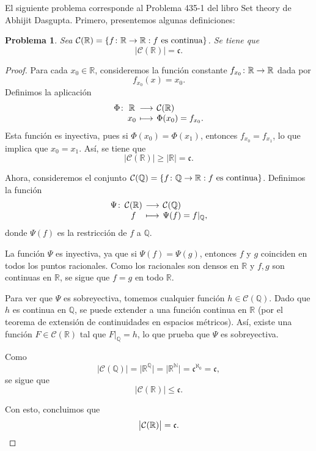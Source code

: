 \documentclass[a4,10pt]{aleph-notas}
\newtheorem*{prob}{Problema}
\begin{document}
\encabezado

\noindent
El siguiente problema corresponde al Problema 435-1 del libro Set theory de Abhijit Dasgupta. Primero, presentemos algunas definiciones:


\begin{prob}
    Sea $\mathcal{C}(\mathbb{R}) = \{ f\colon \mathbb{R} \rightarrow \mathbb{R} : f\text{ es continua} \}$. Se tiene que
    \[
        \big|\mathcal{C}(\mathbb{R})\big| = \mathfrak{c}.
    \]
\end{prob}

\begin{proof}
    Para cada $x_0 \in \mathbb{R}$, consideremos la función constante $f_{x_0}\colon \mathbb{R} \rightarrow \mathbb{R}$ dada por
    \[
        f_{x_0}(x) = x_0.
    \]
    Definimos la aplicación
    \[
        \funcion{\Phi}{\mathbb{R}}{\mathcal{C}(\mathbb{R})}{x_0}{\Phi(x_0) = f_{x_0}.}
    \]
    Esta función es inyectiva, pues si $\Phi(x_0) = \Phi(x_1)$, entonces $f_{x_0} = f_{x_1}$, lo que implica que $x_0 = x_1$. Así, se tiene que
    \[
        \big|\mathcal{C}(\mathbb{R})\big| \geq |\mathbb{R}| = \mathfrak{c}.
    \]

    Ahora, consideremos el conjunto $\mathcal{C}(\mathbb{Q}) = \{ f\colon \mathbb{Q} \rightarrow \mathbb{R} : f \text{ es continua} \}$. Definimos la función
    \[
        \funcion{\Psi}{\mathcal{C}(\mathbb{R})}{\mathcal{C}(\mathbb{Q})}{f}{\Psi(f) = f|_{\mathbb{Q}},}
    \]
    donde $\Psi(f)$ es la restricción de $f$ a $\mathbb{Q}$. 

    La función $\Psi$ es inyectiva, ya que si $\Psi(f) = \Psi(g)$, entonces $f$ y $g$ coinciden en todos los puntos racionales. Como los racionales son densos en $\mathbb{R}$ y $f, g$ son continuas en $\mathbb{R}$, se sigue que $f = g$ en todo $\mathbb{R}$. 

    Para ver que $\Psi$ es sobreyectiva, tomemos cualquier función $h \in \mathcal{C}(\mathbb{Q})$. Dado que $h$ es continua en $\mathbb{Q}$, se puede extender a una función continua en $\mathbb{R}$ (por el teorema de extensión de continuidades en espacios métricos). Así, existe una función $F \in \mathcal{C}(\mathbb{R})$ tal que $F|_{\mathbb{Q}} = h$, lo que prueba que $\Psi$ es sobreyectiva.

    Como
    \[
        \big|\mathcal{C}(\mathbb{Q})\big| = \big|\mathbb{R}^{\mathbb{Q}}\big| = \big|\mathbb{R}^{\mathbb{N}}\big| = \mathfrak{c}^{\aleph_0} = \mathfrak{c},
    \]
    se sigue que
    \[
        \big|\mathcal{C}(\mathbb{R})\big| \leq \mathfrak{c}.
    \]

    Con esto, concluimos que
    \[
        \big|\mathcal{C}(\mathbb{R})\big| = \mathfrak{c}.\qedhere
    \]
\end{proof}


    
\end{document}
